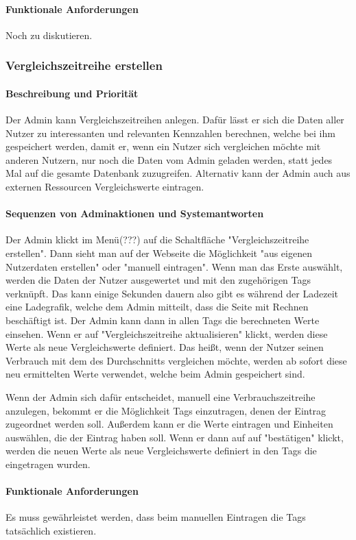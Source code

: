 \paragraph{Funktionale Anforderungen}
Noch zu diskutieren.


\subsubsection{Vergleichszeitreihe erstellen}\label{sec:vergl_zeitr}
\paragraph{Beschreibung und Priorität}
Der Admin kann Vergleichszeitreihen anlegen.
Dafür lässt er sich die Daten aller Nutzer zu interessanten und relevanten
Kennzahlen berechnen, welche bei ihm gespeichert werden, 
damit er, wenn ein Nutzer sich vergleichen möchte mit anderen Nutzern,
nur noch die Daten vom Admin geladen werden, statt jedes Mal auf die gesamte Datenbank zuzugreifen.
Alternativ kann der Admin auch aus externen Ressourcen Vergleichswerte eintragen.

\paragraph{Sequenzen von Adminaktionen und Systemantworten}
Der Admin klickt im Menü(???) auf die Schaltfläche "Vergleichszeitreihe erstellen".
Dann sieht man auf der Webseite die Möglichkeit "aus eigenen Nutzerdaten erstellen" oder "manuell eintragen".
Wenn man das Erste auswählt, werden die Daten der Nutzer ausgewertet und mit den zugehörigen Tags verknüpft.
Das kann einige Sekunden dauern also gibt es während der Ladezeit eine Ladegrafik, 
welche dem Admin mitteilt, dass die Seite mit Rechnen beschäftigt ist.
Der Admin kann dann in allen Tags die berechneten Werte einsehen. 
Wenn er auf "Vergleichszeitreihe aktualisieren" klickt, werden diese Werte als neue Vergleichswerte definiert.
Das heißt, wenn der Nutzer seinen Verbrauch mit dem des Durchschnitts vergleichen möchte,
werden ab sofort diese neu ermittelten Werte verwendet, welche beim Admin gespeichert sind.

Wenn der Admin sich dafür entscheidet, manuell eine Verbrauchszeitreihe anzulegen,
bekommt er die Möglichkeit Tags einzutragen, denen der Eintrag zugeordnet werden soll.
Außerdem kann er die Werte eintragen und Einheiten auswählen, die der Eintrag haben soll.
Wenn er dann auf auf "bestätigen" klickt, werden die neuen Werte als
neue Vergleichswerte definiert in den Tags die eingetragen wurden.
\paragraph{Funktionale Anforderungen}
Es muss gewährleistet werden, dass beim manuellen Eintragen die Tags tatsächlich existieren.
